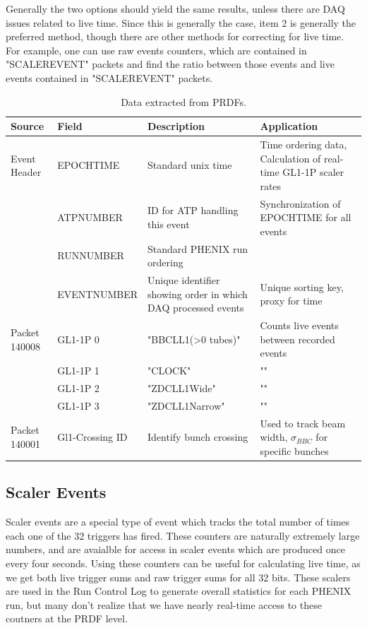 Generally the two options should yield the same results, unless there are DAQ
issues related to live time. Since this is generally the case, item 2 is
generally the preferred method, though there are other methods for correcting
for live time. For example, one can use raw events counters, which are contained
in "SCALEREVENT" packets and find the ratio between those events and live events
contained in "SCALEREVENT" packets.
\begin{table}
\centering
\begin{tabular}{ l l p{6cm} p{8cm} }
\toprule
\textbf{Source} & \textbf{Field} & \textbf{Description} & \textbf{Application} \\
\midrule 
Event Header & EPOCHTIME & Standard unix time & Time ordering data, Calculation of real-time GL1-1P scaler rates \\
 & ATPNUMBER & ID for ATP handling this event & Synchronization of EPOCHTIME for all events \\
 & RUNNUMBER & Standard PHENIX run ordering & \\
 & EVENTNUMBER & Unique identifier showing order in which DAQ processed events & Unique sorting key, proxy for time \\
Packet 140008 & GL1-1P 0 & "BBCLL1(\textgreater0 tubes)" & Counts live events between recorded events \\
 & GL1-1P 1 & "CLOCK" & "" \\
 & GL1-1P 2 & "ZDCLL1Wide" & "" \\
 & GL1-1P 3 & "ZDCLL1Narrow" & "" \\
Packet 140001 & Gl1-Crossing ID & Identify bunch crossing  & Used to track beam width, $\sigma_{BBC}$  for specific bunches\\
\bottomrule
\end{tabular}
\caption{ Data extracted from PRDFs. }
\label{tab:prdf_data_summary}
\end{table}

\subsection{Scaler Events}
Scaler events are a special type of event which tracks the total number of times
each one of the 32 triggers has fired. These counters are naturally extremely
large numbers, and are avaialble for access in scaler events which are produced
once every four seconds.  Using these counters can be useful for calculating
live time, as we get both live trigger sums and raw trigger sums for all 32
bits. These scalers are used in the Run Control Log to generate overall
statistics for each PHENIX run, but many don't realize that we have nearly
real-time access to these coutners at the PRDF level.


